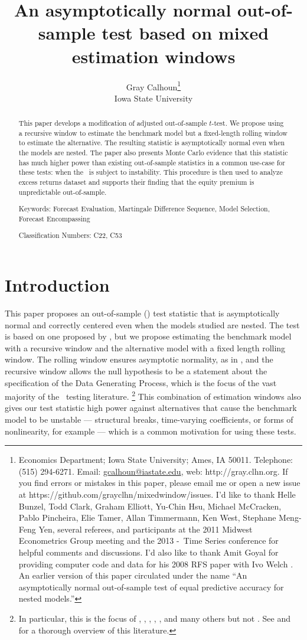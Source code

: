 \documentclass[12pt,fleqn]{article}
\author{Gray Calhoun\thanks{Economics Department; Iowa State
    University; Ames, IA 50011.  Telephone: (515) 294-6271.  Email:
    \guillemotleft \protect\url{gcalhoun@iastate.edu}\guillemotright,
    web: \guillemotleft http://gray.clhn.org\guillemotright.
    If you find errors or mistakes in this paper, please email me or
    open a new issue at
    \guillemotleft https://github.com/grayclhn/mixedwindow/issues\guillemotright.
    I'd like to
    thank Helle Bunzel, Todd Clark, Graham Elliott, Yu-Chin Hsu,
    Michael McCracken, Pablo Pincheira, Elie Tamer, Allan Timmermann, Ken West, Stephane
    Meng-Feng Yen, several referees, and participants at the 2011 Midwest Econometrics
    Group meeting and the 2013 \nber-\nsf\ Time Series conference
    for helpful comments and discussions.  I'd also like to thank Amit
    Goyal for providing computer code and data for his 2008
    RFS paper with Ivo Welch \citep{GoW:08}. An earlier version of this paper
    circulated under the name ``An asymptotically normal out-of-sample
  test of equal predictive accuracy for nested models.''}\\%
  Iowa State University}
\date{\VERSION}
\title{An asymptotically normal out-of-sample test based on
  mixed estimation windows}
\begin{document}
\maketitle

\begin{abstract}
  \noindent This paper develops a modification of  adjusted out-of-sample $t$-test. We propose
  using a recursive window to estimate the benchmark model but a
  fixed-length rolling window to estimate the alternative. The
  resulting statistic is asymptotically normal even when the models
  are nested. The
  paper also presents Monte Carlo evidence that this statistic has
  much higher power than existing out-of-sample statistics in a common
  use-case for these tests: when the \dgp\ is subject to instability.
  This procedure is then used to analyze
   excess returns dataset
  and supports their finding that the equity premium is unpredictable
  out-of-sample.

\strut

\noindent Keywords: Forecast Evaluation, Martingale Difference
Sequence, Model Selection, Forecast Encompassing

\strut

\noindent {} Classification Numbers: C22, C53

\end{abstract}
\newpage
\markboth{}{}
\tableofcontents
\newpage

\section{Introduction}

This paper proposes an out-of-sample (\oos) test statistic that is
asymptotically normal and correctly centered even when the models
studied are nested. The test is based on one proposed by
\citet{ClW:06,ClW:07}, but we propose estimating the benchmark model
with a recursive window and the alternative model with a fixed length
rolling window. The rolling window ensures asymptotic normality, as in
\citet{GiW:06}, and the recursive window allows the null hypothesis to
be a statement about the specification of the Data Generating Process,
which is the focus of the vast majority of the \oos\ testing
literature.%
\footnote{In particular, this is the focus of \citet{Wes:96},
  \citet{ClM:01}, \citet{Mcc:07}, \citet{ClW:06}, \citet{ClW:07}, and
  many others but not \citet{GiW:06}. See \citet{Wes:06} and
  \citet{ClM:13} for a thorough overview of this literature.} %
This combination of estimation windows also gives our test statistic
high power against alternatives that cause the benchmark model
to be unstable --- structural breaks, time-varying coefficients, or
forms of nonlinearity, for example --- which is a common motivation
for using these tests.
\end{document}
